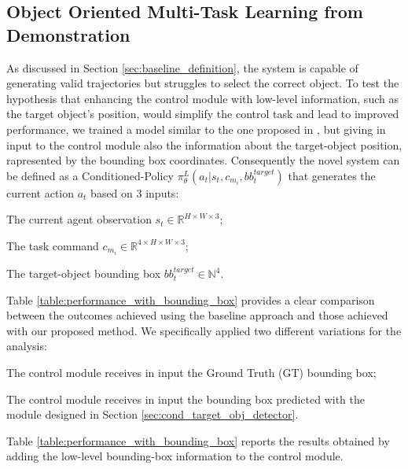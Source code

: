 \subsection{Object Oriented Multi-Task Learning from Demonstration}
\label{sec:obj_oriented_multi_task_lfd}
As discussed in Section \ref{sec:baseline_definition}, the system is capable of generating valid trajectories but struggles to select the correct object. To test the hypothesis that enhancing the control module with low-level information, such as the target object's position, would simplify the control task and lead to improved performance, we trained a model similar to the one proposed in \cite{mandi2022towards_more_generalizable_one_shot}, but giving in input to the control module also the information about the target-object position, rapresented by the bounding box coordinates.
Consequently the novel system can be defined as a Conditioned-Policy $\pi^{L}_{\theta}(a_{t} | s_{t}, c_{m_{i}}, bb_{t}^{target})$ that generates the current action $a_{t}$ based on 3 inputs: \begin{enumerate*}[label=(\arabic*)]
    \item The current agent observation $s_{t} \in \mathbb{R}^{H \times W \times 3}$;
    \item The task command $c_{m_{i}} \in \mathbb{R}^{4 \times H \times W \times 3}$;
    \item The target-object bounding box $bb_{t}^{target} \in \mathbb{N}^{4}$.
\end{enumerate*}
\newline Table \ref{table:performance_with_bounding_box} provides a clear comparison between the outcomes achieved using the baseline approach and those achieved with our proposed method. We specifically applied two different variations for the analysis:
\begin{enumerate*}[label=(\arabic*)]
    \item The control module receives in input the Ground Truth (GT) bounding box;
    \item The control module receives in input the bounding box predicted with the module designed in Section \ref{sec:cond_target_obj_detector}.
\end{enumerate*}
\newline Table \ref{table:performance_with_bounding_box} reports the results obtained by adding the low-level bounding-box information to the control module.

